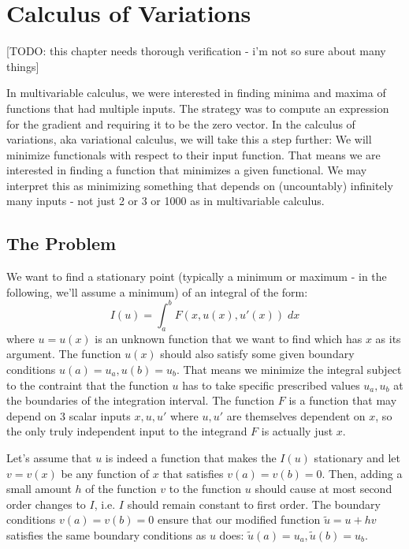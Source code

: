\section{Calculus of Variations} 

[TODO: this chapter needs thorough verification - i'm not so sure about many things]

In multivariable calculus, we were interested in finding minima and maxima of functions that had multiple inputs. The strategy was to compute an expression for the gradient and requiring it to be the zero vector. In the calculus of variations, aka variational calculus, we will take this a step further: We will minimize functionals with respect to their input function. That means we are interested in finding a function that minimizes a given functional. We may interpret this as minimizing something that depends on (uncountably) infinitely many inputs - not just 2 or 3 or 1000 as in multivariable calculus.


\subsection{The Problem}
We want to find a stationary point (typically a minimum or maximum - in the following, we'll assume a minimum) of an integral of the form:
\begin{equation}
 I(u) = \int_a^b F(x,u(x),u'(x)) \; dx
\end{equation}
where $u = u(x)$ is an unknown function that we want to find which has $x$ as its argument. The function $u(x)$ should also satisfy some given boundary conditions $u(a) = u_a, u(b) = u_b$. That means we minimize the integral subject to the contraint that the function $u$ has to take specific prescribed values $u_a, u_b$ at the boundaries of the integration interval. The function $F$ is a function that may depend on 3 scalar inputs $x,u,u'$ where $u,u'$ are themselves dependent on $x$, so the only truly independent input to the integrand $F$ is actually just $x$.

Let's assume that $u$ is indeed a function that makes the $I(u)$ stationary and let $v = v(x)$ be any function of $x$ that satisfies $v(a) = v(b) = 0$. Then, adding a small amount $h$ of the function $v$ to the function $u$ should cause at most second order changes to $I$, i.e. $I$ should remain constant to first order. The boundary conditions $v(a) = v(b) = 0$ ensure that our modified function $\tilde{u} = u + h v$ satisfies the same boundary conditions as $u$ does: $\tilde{u}(a) = u_a, \tilde{u}(b) = u_b$.

